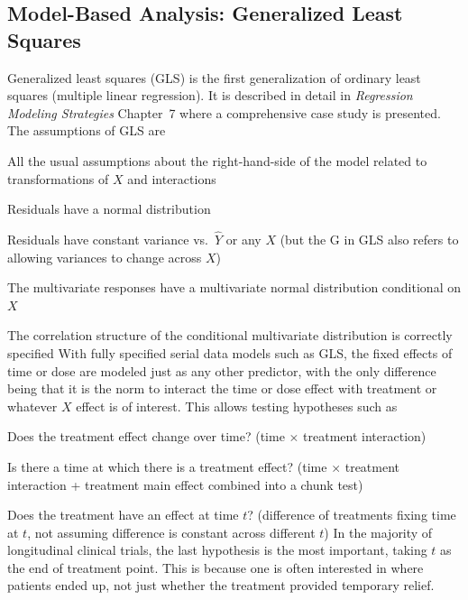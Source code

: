 \subsection{Model-Based Analysis: Generalized Least Squares}\ipacue
Generalized least squares (GLS) is the first generalization of ordinary
least squares (multiple linear regression).  It is described in detail
in \emph{Regression Modeling Strategies} Chapter~7 where a
comprehensive case study is presented.  The assumptions of GLS are
\bi
\item All the usual assumptions about the right-hand-side of the model
  related to transformations of $X$ and interactions
\item Residuals have a normal distribution
\item Residuals have constant variance vs.\ $\hat{Y}$ or any $X$ (but
  the G in GLS also refers to allowing variances to change across $X$)
\item The multivariate responses have a multivariate normal
  distribution conditional on $X$
\item The correlation structure of the conditional multivariate
  distribution is correctly specified
\ei
With fully specified serial data models such as GLS, the fixed effects
of time or dose are modeled just as any other predictor, with the only
difference being that it is the norm to interact the time or dose
effect with treatment or whatever $X$ effect is of interest.  This
allows testing hypotheses such as
\bi
\item Does the treatment effect change over time? (time $\times$
  treatment interaction)
\item Is there a time at which there is a treatment effect? (time
  $\times$ treatment interaction + treatment main effect combined into
  a chunk test)
\item Does the treatment have an effect at time $t$? (difference of
  treatments fixing time at $t$, not assuming difference is constant
  across different $t$)
\ei
In the majority of longitudinal clinical trials, the last hypothesis \ipacue
is the most important, taking $t$ as the end of treatment point.  This
is because one is often interested in where patients ended up, not
just whether the treatment provided temporary relief.

